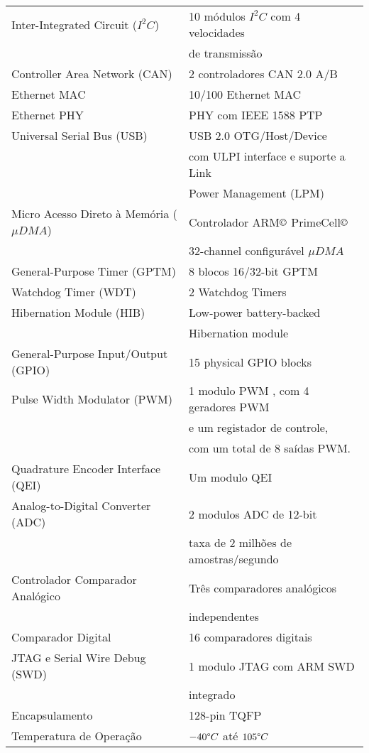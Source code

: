 \begin{table}[!h]
\begin{tabular}{|l|l|}
\hline
Inter-Integrated Circuit ($I^{2}C$) & 10 módulos $I^{2}C$ com 4 velocidades \\
 & de transmissão\\
\hline
Controller Area Network (CAN) & 2 controladores CAN 2.0 A/B \\
\hline
Ethernet MAC & 10/100 Ethernet MAC \\
\hline
Ethernet PHY & PHY com IEEE 1588 PTP \\
\hline
Universal Serial Bus (USB) & USB 2.0 OTG/Host/Device  \\ 
& com ULPI interface e suporte a Link   \\
& Power Management (LPM) \\
\hline
Micro Acesso Direto à Memória ($\mu DMA$) & Controlador ARM$\copyright$ PrimeCell$\copyright$  \\
& 32-channel configurável  $\mu DMA$ \\
\hline
General-Purpose Timer (GPTM) & 8 blocos 16/32-bit GPTM \\
\hline
Watchdog Timer (WDT) & 2 Watchdog Timers \\
\hline
Hibernation Module (HIB) & Low-power battery-backed \\
 & Hibernation module \\
\hline
General-Purpose Input/Output (GPIO) & 15 physical GPIO blocks \\
\hline
Pulse Width Modulator (PWM) & 1 modulo PWM , com 4 geradores PWM  \\
 & e um  registador de controle,\\
 &  com um total de 8  saídas PWM.\\
\hline
Quadrature Encoder Interface (QEI) & Um modulo QEI \\
\hline
Analog-to-Digital Converter (ADC) & 2 modulos ADC de 12-bit\\
 & taxa de 2 milhões de amostras/segundo\\
\hline
Controlador Comparador Analógico & Três comparadores analógicos \\
& independentes \\
\hline
Comparador Digital & 16 comparadores digitais \\
\hline
JTAG e Serial Wire Debug (SWD) & 1 modulo JTAG  com ARM SWD\\
& integrado \\
\hline
Encapsulamento & 128-pin TQFP \\
\hline
Temperatura de Operação & $-40 \degree C$ até $105 \degree C$ \\
\hline
\end{tabular}
\end{table}

